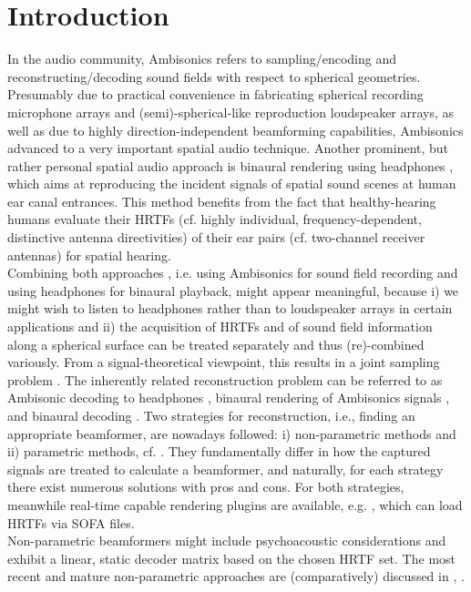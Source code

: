 \documentclass[conference]{IEEEtran}
\def\NewL{\\\noindent\hspace*{5mm}}
\begin{document}
\section{Introduction}
%
In the audio community, Ambisonics \cite{Zotter2019_Ambisonics} refers to sampling/encoding and reconstructing/decoding sound fields with respect to spherical geometries.
%
Presumably due to practical convenience in fabricating spherical recording microphone arrays and (semi)-spherical-like reproduction loudspeaker arrays, as well as due to highly direction-independent beamforming capabilities, Ambisonics advanced to a very important spatial audio technique.
%
Another prominent, but rather personal spatial audio approach is binaural rendering using headphones \cite{Moeller1992}, which aims at reproducing the incident signals of spatial sound scenes at human ear canal entrances.
%
This method benefits from the fact that healthy-hearing humans evaluate their HRTFs \cite{Moeller1992} (cf. highly individual, frequency-dependent, distinctive antenna directivities) of their ear pairs (cf. two-channel receiver antennas) for spatial hearing.
%
\NewL Combining both approaches \cite{McKeag1996}, i.e. using Ambisonics for sound field recording and using headphones for binaural playback, might appear meaningful, because i) we might wish to listen to headphones rather than to loudspeaker arrays in certain applications and ii) the acquisition of HRTFs and of sound field information along a spherical surface can be treated separately and thus (re)-combined variously.
%
From a signal-theoretical viewpoint, this results in a joint sampling problem \cite{BenHur2018}.
%
The inherently related reconstruction problem can be referred to as Ambisonic decoding to headphones \cite[Ch.~4.11]{Zotter2019_Ambisonics}, binaural rendering of Ambisonics signals \cite{Zaunschirm2018}, and binaural decoding \cite{Politis2016_diss}.
%
Two strategies for reconstruction, i.e., finding an appropriate beamformer, are nowadays followed: i) non-parametric methods and ii) parametric methods, cf. \cite{Politis2016_diss}.
%
They fundamentally differ in how the captured signals are treated to calculate a beamformer, and naturally, for each strategy there exist numerous solutions with pros and cons.
%
For both strategies, meanwhile real-time capable rendering plugins are available, e.g. \cite{McCormack2019}, which can load HRTFs via SOFA files.
%
\NewL Non-parametric beamformers might include psychoacoustic considerations and exhibit a linear, static decoder matrix based on the chosen HRTF set.
%
The most recent and mature non-parametric approaches are (comparatively) discussed in \cite{Zaunschirm2018, Schoerkhuber2018_MagLS, Luebeck2020, Deppisch2021, Engel2022}, \cite[Ch.~4.11]{Zotter2019_Ambisonics}.
\end{document}
